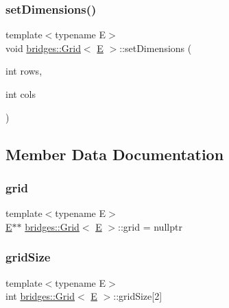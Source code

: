 \subsubsection{\texorpdfstring{setDimensions()}{setDimensions()}}
{\footnotesize\ttfamily template$<$typename E$>$ \\
void \mbox{\hyperlink{classbridges_1_1_grid}{bridges\+::\+Grid}}$<$ \mbox{\hyperlink{namespacebridges_acfb0a4f7877d8f63de3e6862004c50eda3a3ea00cfc35332cedf6e5e9a32e94da}{E}} $>$\+::set\+Dimensions (\begin{DoxyParamCaption}\item[{int}]{rows,  }\item[{int}]{cols }\end{DoxyParamCaption})\hspace{0.3cm}{\ttfamily [inline]}}



\subsection{Member Data Documentation}
\mbox{\label{classbridges_1_1_grid_aea6c38498d477f09dc03906ee6fb6e19}} 
\subsubsection{\texorpdfstring{grid}{grid}}
{\footnotesize\ttfamily template$<$typename E$>$ \\
\mbox{\hyperlink{namespacebridges_acfb0a4f7877d8f63de3e6862004c50eda3a3ea00cfc35332cedf6e5e9a32e94da}{E}}$\ast$$\ast$ \mbox{\hyperlink{classbridges_1_1_grid}{bridges\+::\+Grid}}$<$ \mbox{\hyperlink{namespacebridges_acfb0a4f7877d8f63de3e6862004c50eda3a3ea00cfc35332cedf6e5e9a32e94da}{E}} $>$\+::grid = nullptr\hspace{0.3cm}{\ttfamily [protected]}}

\mbox{\label{classbridges_1_1_grid_af7c3a077b54e3346621e54276c1fa13e}} 
\subsubsection{\texorpdfstring{gridSize}{gridSize}}
{\footnotesize\ttfamily template$<$typename E$>$ \\
int \mbox{\hyperlink{classbridges_1_1_grid}{bridges\+::\+Grid}}$<$ \mbox{\hyperlink{namespacebridges_acfb0a4f7877d8f63de3e6862004c50eda3a3ea00cfc35332cedf6e5e9a32e94da}{E}} $>$\+::grid\+Size\mbox{[}2\mbox{]}\hspace{0.3cm}{\ttfamily [protected]}}

